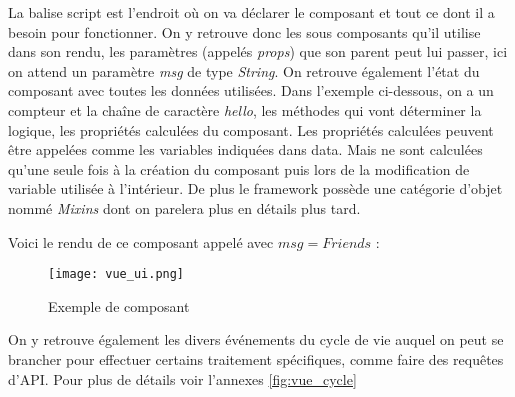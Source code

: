 La balise script est l'endroit où on va déclarer le composant et tout ce dont il a besoin pour fonctionner. On y retrouve donc les sous composants qu'il utilise dans son rendu, les paramètres (appelés \textit{props}) que son parent peut lui passer, ici on attend un paramètre \textit{msg} de type \textit{String}.
On retrouve également l'état du composant avec toutes les données utilisées. Dans l'exemple ci-dessous, on a un compteur et la chaîne de caractère \textit{hello}, les méthodes qui vont déterminer la logique, les propriétés calculées du composant. Les propriétés calculées peuvent être appelées comme les variables indiquées dans data. Mais ne sont calculées qu'une seule fois à la création du composant puis lors de la modification de variable utilisée à l'intérieur. 
De plus le framework possède une catégorie d'objet nommé \textit{Mixins} dont on parelera plus en détails plus tard.

Voici le rendu de ce composant appelé avec $msg = Friends$ :
\begin{figure}[htbp]
    \center
    \texttt{[image: vue\_ui.png]}
    \caption{Exemple de composant}
    
\end{figure}

On y retrouve également les divers événements du cycle de vie auquel on  peut se brancher pour effectuer certains traitement spécifiques, comme faire des requêtes d'API. Pour plus de détails voir l'annexes \ref{fig:vue_cycle}


